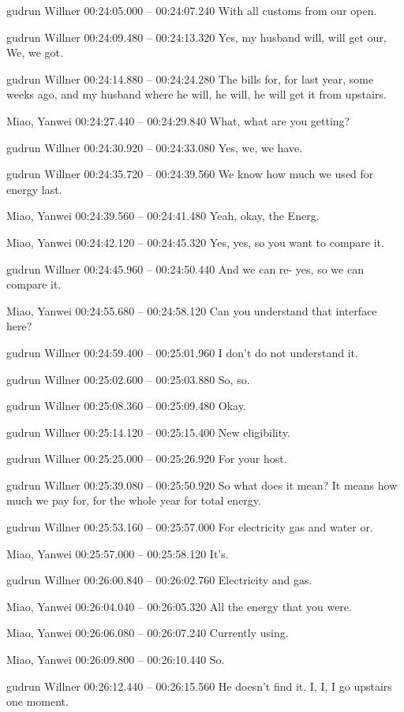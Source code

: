 {gudrun Willner 00:24:05.000 -- 00:24:07.240
With all customs from our open.

gudrun Willner 00:24:09.480 -- 00:24:13.320
Yes, my husband will, will get our, We, we got.

gudrun Willner 00:24:14.880 -- 00:24:24.280
The bills for, for last year, some weeks ago, and my husband where he will, he will, he will get it from upstairs.

Miao, Yanwei 00:24:27.440 -- 00:24:29.840
What, what are you getting?

gudrun Willner 00:24:30.920 -- 00:24:33.080
Yes, we, we have.

gudrun Willner 00:24:35.720 -- 00:24:39.560
We know how much we used for energy last.

Miao, Yanwei 00:24:39.560 -- 00:24:41.480
Yeah, okay, the Energ.

Miao, Yanwei 00:24:42.120 -- 00:24:45.320
Yes, yes, so you want to compare it.

gudrun Willner 00:24:45.960 -- 00:24:50.440
And we can re- yes, so we can compare it.

Miao, Yanwei 00:24:55.680 -- 00:24:58.120
Can you understand that interface here?

gudrun Willner 00:24:59.400 -- 00:25:01.960
I don't do not understand it.

gudrun Willner 00:25:02.600 -- 00:25:03.880
So, so.

gudrun Willner 00:25:08.360 -- 00:25:09.480
Okay.

gudrun Willner 00:25:14.120 -- 00:25:15.400
New eligibility.

gudrun Willner 00:25:25.000 -- 00:25:26.920
For your host.

gudrun Willner 00:25:39.080 -- 00:25:50.920
So what does it mean? It means how much we pay for, for the whole year for total energy.

gudrun Willner 00:25:53.160 -- 00:25:57.000
For electricity gas and water or.

Miao, Yanwei 00:25:57.000 -- 00:25:58.120
It's.

gudrun Willner 00:26:00.840 -- 00:26:02.760
Electricity and gas.

Miao, Yanwei 00:26:04.040 -- 00:26:05.320
All the energy that you were.

Miao, Yanwei 00:26:06.080 -- 00:26:07.240
Currently using.

Miao, Yanwei 00:26:09.800 -- 00:26:10.440
So.

gudrun Willner 00:26:12.440 -- 00:26:15.560
He doesn't find it. I, I, I go upstairs one moment.

}
